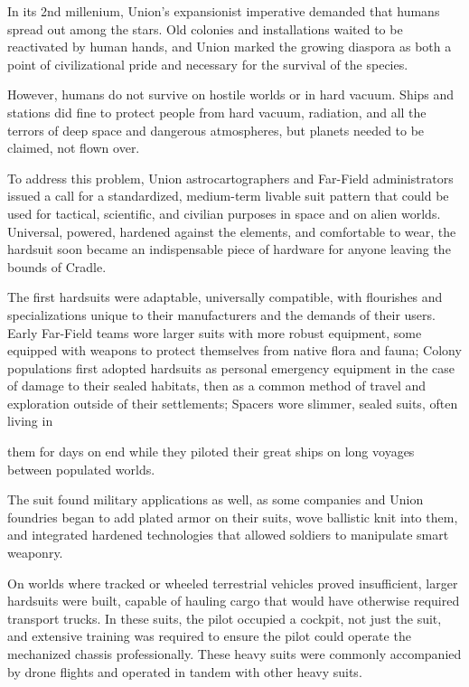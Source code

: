 In its 2nd millenium, Union’s expansionist imperative demanded that humans spread out among
the stars. Old colonies and installations waited to be reactivated by human hands, and Union
marked the growing diaspora as both a point of civilizational pride and necessary for the survival
of the species.


However, humans do not survive on hostile worlds or in hard vacuum. Ships and stations did fine
to protect people from hard vacuum, radiation, and all the terrors of deep space and dangerous
atmospheres, but planets needed to be claimed, not flown over.


To address this problem, Union astrocartographers and Far-Field administrators issued a call for
a standardized, medium-term livable suit pattern that could be used for tactical, scientific, and
civilian purposes in space and on alien worlds. Universal, powered, hardened against the
elements, and comfortable to wear, the hardsuit soon became an indispensable piece of
hardware for anyone leaving the bounds of Cradle.


The first hardsuits were adaptable, universally compatible, with flourishes and specializations
unique to their manufacturers and the demands of their users. Early Far-Field teams wore larger
suits with more robust equipment, some equipped with weapons to protect themselves from
native flora and fauna; Colony populations first adopted hardsuits as personal emergency
equipment in the case of damage to their sealed habitats, then as a common method of travel
and exploration outside of their settlements; Spacers wore slimmer, sealed suits, often living in




them for days on end while they piloted their great ships on long voyages between populated
worlds.


The suit found military applications as well, as some companies and Union foundries began to
add plated armor on their suits, wove ballistic knit into them, and integrated hardened
technologies that allowed soldiers to manipulate smart weaponry.


On worlds where tracked or wheeled terrestrial vehicles proved insufficient, larger hardsuits were
built, capable of hauling cargo that would have otherwise required transport trucks. In these
suits, the pilot occupied a cockpit, not just the suit, and extensive training was required to ensure
the pilot could operate the mechanized chassis professionally. These heavy suits were commonly
accompanied by drone flights and operated in tandem with other heavy suits.


